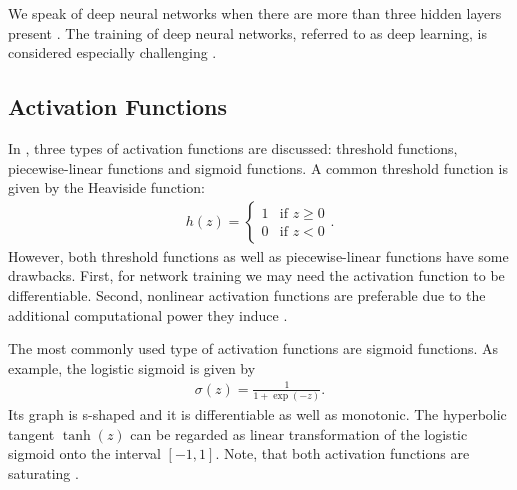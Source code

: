 We speak of deep neural networks when there are more than three hidden layers present \cite{Bengio:2009}. The training of deep neural networks, referred to as deep learning, is considered especially challenging \cite{Bengio:2009}. %

\subsection{Activation Functions}
\label{subsec:activation-functions}

In \cite[p.~34-37]{Haykin:2005}, three types of activation functions are discussed: threshold functions, piecewise-linear functions and sigmoid functions. A common threshold function is given by the Heaviside function:
\begin{align}
	h(z) = 
	\begin{cases}
		1  & \text{if } z \geq 0\\
		0 & \text{if } z < 0
	\end{cases}.
\end{align}
However, both threshold functions as well as piecewise-linear functions have some drawbacks. First, for network training we may need the activation function to be differentiable. Second, nonlinear activation functions are preferable due to the additional computational power they induce \cite{DudaHartStork:2001,HornikStinchcombeWhite:1989}.

The most commonly used type of activation functions are sigmoid functions. As example, the logistic sigmoid is given by
\begin{align}
	\label{eq:logistic-sigmoid}
	\sigma(z) = \frac{1}{1 + \exp(-z)}.
\end{align}
Its graph is s-shaped and it is differentiable as well as monotonic. The hyperbolic tangent $\tanh(z)$ can be regarded as linear transformation of the logistic sigmoid onto the interval $[-1,1]$. Note, that both activation functions are saturating \cite[p.~307-308]{DudaHartStork:2001}.


